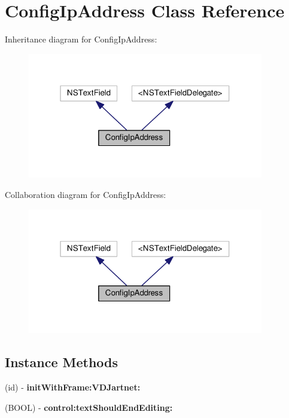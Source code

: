 \hypertarget{interfaceConfigIpAddress}{}\section{Config\+Ip\+Address Class Reference}
\label{interfaceConfigIpAddress}


Inheritance diagram for Config\+Ip\+Address\+:
\nopagebreak
\begin{figure}[H]
\begin{center}
\leavevmode
\includegraphics[width=292pt]{interfaceConfigIpAddress__inherit__graph}
\end{center}
\end{figure}


Collaboration diagram for Config\+Ip\+Address\+:
\nopagebreak
\begin{figure}[H]
\begin{center}
\leavevmode
\includegraphics[width=292pt]{interfaceConfigIpAddress__coll__graph}
\end{center}
\end{figure}
\subsection*{Instance Methods}
\begin{DoxyCompactItemize}
\item 
(id) -\/ {\bfseries init\+With\+Frame\+:\+V\+D\+Jartnet\+:}
\item 
\mbox{\label{interfaceConfigIpAddress_a62f80031eea3a4d441b16daeb9ee0e4f}} 
(B\+O\+OL) -\/ {\bfseries control\+:text\+Should\+End\+Editing\+:}
\end{DoxyCompactItemize}


